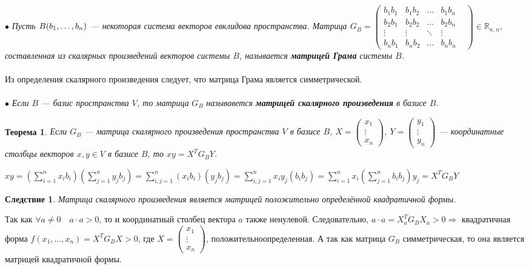 $\bullet$ \textit{Пусть $B(b_1,\dots,b_n)$ --- некоторая система векторов евклидова пространства. Матрица $G_B=
	\begin{pmatrix}
		b_1 b_1 & b_1 b_2 & \dots & b_1 b_n\\
		b_2 b_1 & b_2 b_2&\dots& b_2 b_n\\
		\vdots&\vdots&\ddots&\vdots&\\
		b_n b_1 &b_n b_2 &\dots&b_n b_n
	\end{pmatrix}\in \mathbb{R}_{n,n}$, составленная из скалярных произведений векторов системы $B$, называется \textbf{матрицей Грама} системы $B$.}\\\\
Из определения скалярного произведения следует, что матрица Грама является симметрической.\\\\
$\bullet$ \textit{Если $B$ --- базис пространства $V$, то матрица} $G_B$ \textit{называвется \textbf{матрицей скалярного произведения} в базисе $B$.}
\newtheorem*{th14_1_1}{Теорема}\begin{th14_1_1}Если $G_B$ --- матрица скалярного произведения пространства $V$ в базисе $B$, $ X=\begin{pmatrix}
		x_1\\
		\vdots\\
		x_n
	\end{pmatrix}$, 
	$ Y=\begin{pmatrix}
		y_1\\
		\vdots\\
		y_n
	\end{pmatrix}$ --- координатные столбцы векторов $x, y\in V$ в базисе $B$, то $xy=X^T G_B Y $.
\end{th14_1_1}\begin{Proof}
	$xy=(\sum\limits_{i=1}^n x_i b_i)(\sum\limits_{j=1}^n y_j b_j)= \sum\limits_{i,j=1}^n(x_i b_i)(y_j b_j)=\sum\limits_{i,j=1}^nx_i y_j(b_i b_j) =\sum\limits_{i=1}^n x_i (\sum\limits_{j=1}^nb_i b_j)y_j = X^T G_B Y$
\end{Proof}
\newtheorem*{cor14_1_1}{Следствие}\begin{cor14_1_1}Матрица скалярного произведения является матрицей положительно
	определённой квадратичной формы.
\end{cor14_1_1}\begin{Proof} Так как $\forall a \ne 0\quad a\cdot a > 0$, то и координатный столбец вектора $a$ также ненулевой. Следовательно, $a\cdot a= X_a^T G_B X_a >0\Rightarrow$ квадратичная форма $f(x_1,\dots, x_n)=X^T G_B X >0$, где $X = \begin{pmatrix}
		x_1\\ \vdots\\ x_n
	\end{pmatrix}$, положительноопределенная. А так как матрица $G_B$ симметрическая, то она является матрицей квадратичной формы.
\end{Proof}
